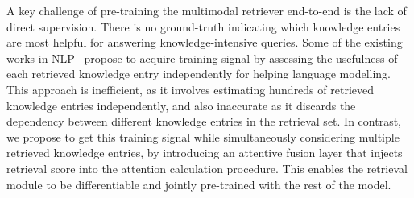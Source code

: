 \documentclass[10pt,twocolumn,letterpaper]{article}
\begin{document}
A key challenge of pre-training the multimodal retriever end-to-end is the lack of direct supervision. 
There is no ground-truth indicating which knowledge entries are most helpful for answering knowledge-intensive queries. Some of the existing works in NLP~\cite{DBLP:journals/corr/abs-2002-08909,DBLP:conf/nips/LewisPPPKGKLYR020,DBLP:conf/nips/SachanRHDY21F} propose to acquire training signal by assessing the usefulness of each retrieved knowledge entry independently for helping language modelling. 
This approach is inefficient, as it involves estimating hundreds of retrieved knowledge entries independently, and also inaccurate as it discards the dependency between different knowledge entries in the retrieval set.
In contrast, we propose to get this training signal while simultaneously considering multiple retrieved knowledge entries, by introducing an attentive fusion layer that injects retrieval score into the attention calculation procedure. This enables the retrieval module to be differentiable and jointly pre-trained with the rest of the model.
\end{document}
